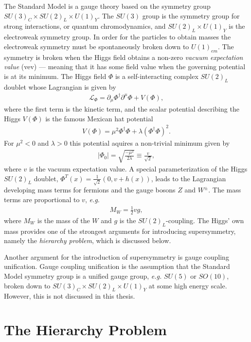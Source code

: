 \documentclass[twoside,english]{uiofysmaster}
\begin{document}
The Standard Model is a gauge theory based on the symmetry group $SU(3)_C \times SU(2)_L \times U(1)_Y$. The $SU(3)$ group is the symmetry group for strong interactions, or quantum chromodynamics, and $SU(2)_L \times U(1)_Y$ is the electroweak symmetry group. In order for the particles to obtain masses the electroweak symmetry must be spontaneously broken down to $U(1)_{em}$. The symmetry is broken when the Higgs field obtains a non-zero \textit{vacuum expectation value} (vev) --- meaning that it has some field value when the governing potential is at its minimum. The Higgs field $\Phi$ is a self-interacting complex $SU(2)_L$ doublet whose Lagrangian is given by
\begin{align}
\mathcal{L}_{\Phi} = \partial_{\mu} \Phi^{\dagger} \partial^{\mu} \Phi + V(\Phi),
\end{align}
where the first term is the kinetic term, and the scalar potential describing the Higgs $V(\Phi)$ is the famous Mexican hat potential
\begin{align}
V(\Phi) = \mu^2 \Phi^{\dagger} \Phi + \lambda (\Phi^{\dagger} \Phi)^2.
\end{align}
For $\mu^2 < 0$ and $\lambda > 0$ this potential aquires a non-trivial minimum given by
\begin{align}
|\Phi_0| = \sqrt{\frac{-\mu^2}{2\lambda}} \equiv \frac{v}{\sqrt{2}},
\end{align}
where $v$ is the vacuum expectation value. A special parameterization of the Higgs $SU(2)_L$ doublet, $\Phi^T(x) = \frac{1}{\sqrt{2}} (0, v + h(x))$, leads to the Lagrangian developing mass terms for fermions and the gauge bosons $Z$ and $W^{\pm}$. The mass terms are proportional to $v$, \textit{e.g.}
\begin{align*}
M_W = \frac{1}{2} v g,
\end{align*}
where $M_W$ is the mass of the $W$ and $g$ is the $SU(2)_L$-coupling. The Higgs' own mass provides one of the strongest arguments for introducing supersymmetry, namely the \textit{hierarchy problem}, which is discussed below. 

Another argument for the introduction of supersymmetry is gauge coupling unification. Gauge coupling unification is the assumption that the Standard Model symmetry group is a unified gauge group, \textit{e.g.} $SU(5)$ or $SO(10)$, broken down to $SU(3)_C \times SU(2)_L \times U(1)_Y$ at some high energy scale. However, this is not discussed in this thesis.

\section{The Hierarchy Problem}
\end{document}
